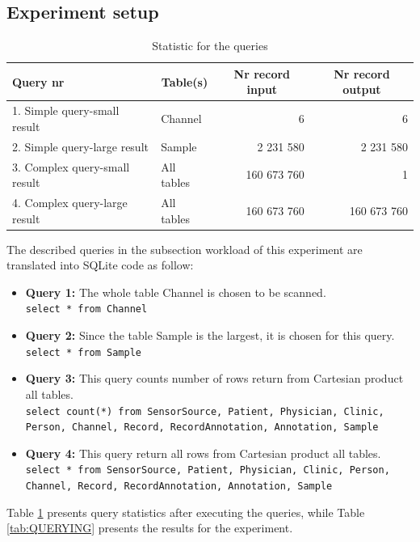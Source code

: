 \subsection{Experiment setup}
\begin{table}
\centering
\begin{tabular}{|l|l|r|r|}
\hline
\cellcolor[HTML]{00D2CB}Query nr & \multicolumn{1}{c|}{\cellcolor[HTML]{00D2CB}Table(s)} & \multicolumn{1}{c|}{\cellcolor[HTML]{00D2CB}Nr record input} & \multicolumn{1}{c|}{\cellcolor[HTML]{00D2CB}Nr record output} \\ \hline
\cellcolor[HTML]{00D2CB}1. Simple query-small result& Channel & 6 & 6 \\ \hline
\cellcolor[HTML]{00D2CB}2. Simple query-large result & Sample & 2 231 580 & 2 231 580 \\ \hline
\cellcolor[HTML]{00D2CB}3. Complex query-small result & All tables & 160 673 760 & 1 \\ \hline
\cellcolor[HTML]{00D2CB}4. Complex query-large result& All tables & 160 673 760 & 160 673 760 \\ \hline
\end{tabular}
\caption{Statistic for the queries}
\label{tab:QUERYSTATISTICS}
\end{table}
The described queries in the subsection workload of this experiment are translated into SQLite code as follow:
\begin{itemize}
\item \textbf{Query 1:} The whole table Channel is chosen to be scanned.\\\texttt{select * from Channel}
\item \textbf{Query 2:} Since the table Sample is the largest, it is chosen for this query.\\
\texttt{select * from Sample}
\item \textbf{Query 3:} This query counts number of rows return from Cartesian product all tables.\\
\texttt{select count(*) from SensorSource, Patient, Physician, Clinic, Person, Channel, Record, RecordAnnotation, Annotation, Sample}
\item \textbf{Query 4:} This query return all rows from Cartesian product all tables.\\
\texttt{select * from SensorSource, Patient, Physician, Clinic, Person, Channel, Record, RecordAnnotation, Annotation, Sample}
\end{itemize}
Table \ref{tab:QUERYSTATISTICS} presents query statistics after executing the queries, while Table \ref{tab:QUERYING} presents the results for the experiment.
